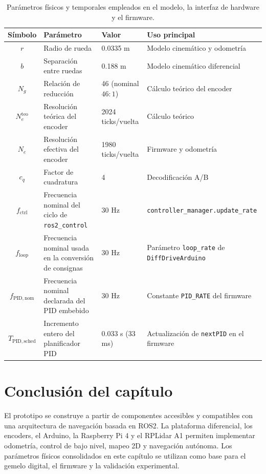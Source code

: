 \begin{table}[H]
\centering
\caption{Parámetros físicos y temporales empleados en el modelo, la interfaz de hardware y el firmware.}
\label{tab:parametros_modelo}
\small
\begin{tabular}{c p{4.2cm} p{3.0cm} p{4.2cm}}
\toprule
\textbf{Símbolo} & \textbf{Parámetro} & \textbf{Valor} & \textbf{Uso principal} \\
\midrule
$r$ & Radio de rueda & 0.0335 m & Modelo cinemático y odometría \\
$b$ & Separación entre ruedas & 0.188 m & Modelo cinemático diferencial \\
$N_g$ & Relación de reducción & 46 (nominal $46{:}1$) & Cálculo teórico del encoder \\
$N_e^{\mathrm{teo}}$ & Resolución teórica del encoder & 2024 ticks/vuelta & Cálculo teórico \\
$N_e$ & Resolución efectiva del encoder & 1980 ticks/vuelta & Firmware y odometría \\
$c_q$ & Factor de cuadratura & 4 & Decodificación A/B \\
$f_{\mathrm{ctrl}}$ & Frecuencia nominal del ciclo de \texttt{ros2\_control} & 30 Hz & \texttt{controller\_manager.update\_rate} \\
$f_{\mathrm{loop}}$ & Frecuencia nominal usada en la conversión de consignas & 30 Hz & Parámetro \texttt{loop\_rate} de \texttt{DiffDriveArduino} \\
$f_{\mathrm{PID,nom}}$ & Frecuencia nominal declarada del PID embebido & 30 Hz & Constante \texttt{PID\_RATE} del firmware \\
$T_{\mathrm{PID,sched}}$ & Incremento entero del planificador PID & 0.033 s (33 ms) & Actualización de \texttt{nextPID} en el firmware \\
\bottomrule
\end{tabular}
\end{table}

\section*{Conclusión del capítulo}

El prototipo se construye a partir de componentes accesibles y compatibles con una arquitectura de navegación basada en \gls{ROS2}. La plataforma diferencial, los encoders, el \gls{Arduino}, la Raspberry Pi 4 y el RPLidar A1 permiten implementar odometría, control de bajo nivel, mapeo 2D y navegación autónoma. Los parámetros físicos consolidados en este capítulo se utilizan como base para el gemelo digital, el firmware y la validación experimental.